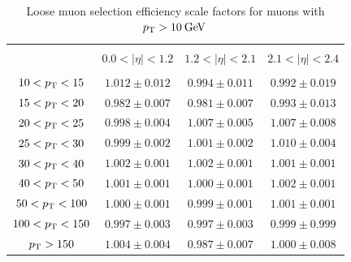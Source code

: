 \begin{table}[!ht]
 \centering
 \begin{tabular}{|c|c|c|c|}
 \hline
 &                          &                              &                           \\
 & $0.0 < |\eta| < 1.2$ & $1.2 < |\eta| < 2.1$ & $2.1 < |\eta| < 2.4$ \\
  &                          &                              &                           \\
 \hline
 $10 < p_\mathrm{T} <  15$ &  $1.012 \pm  0.012 $ &  $0.994 \pm  0.011$  &  $0.992 \pm  0.019$ \\
 \hline
 $15 < p_\mathrm{T}<  20$ &  $0.982 \pm  0.007$  &  $0.981 \pm  0.007$  &  $0.993 \pm  0.013$ \\
 \hline
 $20 < p_\mathrm{T} <  25$ &  $0.998 \pm  0.004$  &  $1.007 \pm  0.005$  &  $1.007 \pm  0.008$ \\
 \hline
 $25 <  p_\mathrm{T}<  30$ &  $0.999 \pm  0.002$  &  $1.001 \pm  0.002$  &  $1.010 \pm  0.004$ \\
 \hline
 $30 < p_\mathrm{T}<  40$ &  $1.002 \pm  0.001$  &  $1.002 \pm  0.001$  &  $1.001 \pm  0.001$ \\
 \hline
 $40 < p_\mathrm{T} <  50$ &  $1.001 \pm  0.001$  &  $1.000 \pm  0.001$  &  $1.002 \pm  0.001 $\\
 \hline
 $50 <p_\mathrm{T} < 100$ &  $1.000 \pm  0.001$  &  $0.999 \pm  0.001$  &  $1.001 \pm  0.001$ \\
 \hline
$100 < p_\mathrm{T}< 150$ & $ 0.997 \pm  0.003$  &  $0.997 \pm  0.003$  &  $0.999 \pm  0.999$ \\
\hline
$p_\mathrm{T}> 150$ &  $1.004 \pm  0.004$  &  $0.987 \pm  0.007 $ &  $1.000 \pm  0.008$ \\
\hline
\end{tabular}
\caption{Loose muon selection efficiency scale factors for muons with $p_\mathrm{T}>10\:\mathrm{Ge\kern -0.1em V}\:$}
\end{table}


